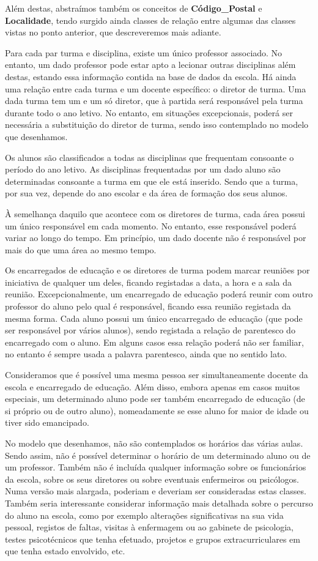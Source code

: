 \documentclass[12pt,a4paper,reqno]{report}
\numberwithin{figure}{section}
\numberwithin{equation}{section}
\begin{document}
Além destas, abstraímos também os conceitos de \textbf{Código\_Postal} e \textbf{Localidade}, tendo surgido ainda classes de relação entre algumas das classes vistas no ponto anterior, que descreveremos mais adiante.

Para cada par turma e disciplina, existe um único professor associado. No entanto, um dado professor pode estar apto a lecionar outras disciplinas além destas, estando essa informação contida na base de dados da escola. Há ainda uma relação entre cada turma e um docente específico: o diretor de turma. Uma dada turma tem um e um só diretor, que à partida será responsável pela turma durante todo o ano letivo. No entanto, em situações excepcionais, poderá ser necessária a substituição do diretor de turma, sendo isso contemplado no modelo que desenhamos.

Os alunos são classificados a todas as disciplinas que frequentam consoante o período do ano letivo. As disciplinas frequentadas por um dado aluno são determinadas consoante a turma em que ele está inserido. Sendo que a turma, por sua vez, depende do ano escolar e da área de formação dos seus alunos.

À semelhança daquilo que acontece com os diretores de turma, cada área possui um único responsável em cada momento. No entanto, esse responsável poderá variar ao longo do tempo. Em princípio, um dado docente não é responsável por mais do que uma área ao mesmo tempo.

Os encarregados de educação e os diretores de turma podem marcar reuniões por iniciativa de qualquer um deles, ficando registadas a data, a hora e a sala da reunião. Excepcionalmente, um encarregado de educação poderá reunir com outro professor do aluno pelo qual é responsável, ficando essa reunião registada da mesma forma. Cada aluno possui um único encarregado de educação (que pode ser responsável por vários alunos), sendo registada a relação de parentesco do encarregado com o aluno. Em alguns casos essa relação poderá não ser familiar, no entanto é sempre usada a palavra parentesco, ainda que no sentido lato.

Consideramos que é possível uma mesma pessoa ser simultaneamente docente da escola e encarregado de educação. Além disso, embora apenas em casos muitos especiais, um determinado aluno pode ser também encarregado de educação (de si próprio ou de outro aluno), nomeadamente se esse aluno for maior de idade ou tiver sido emancipado.

No modelo que desenhamos, não são contemplados os horários das várias aulas. Sendo assim, não é possível determinar o horário de um determinado aluno ou de um professor. Também não é incluída qualquer informação sobre os funcionários da escola, sobre os seus diretores ou sobre eventuais enfermeiros ou psicólogos. Numa versão mais alargada, poderiam e deveriam ser consideradas estas classes. Também seria interessante considerar informação mais detalhada sobre o percurso do aluno na escola, como por exemplo alterações significativas na sua vida pessoal, registos de faltas, visitas à enfermagem ou ao gabinete de psicologia, testes psicotécnicos que tenha efetuado, projetos e grupos extracurriculares em que tenha estado envolvido, etc.
\end{document}
